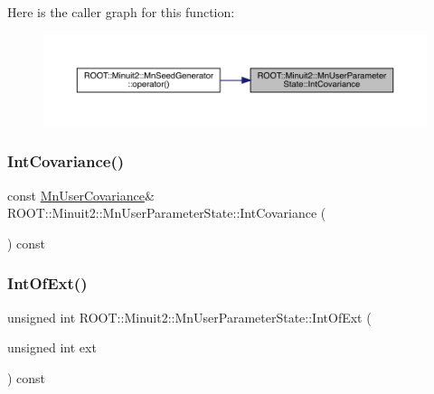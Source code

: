Here is the caller graph for this function\+:\nopagebreak
\begin{figure}[H]
\begin{center}
\leavevmode
\includegraphics[width=350pt]{d3/de0/classROOT_1_1Minuit2_1_1MnUserParameterState_ad4b67f98845868977a7b7d99c8ffbe2d_icgraph}
\end{center}
\end{figure}
\mbox{\label{classROOT_1_1Minuit2_1_1MnUserParameterState_ad4b67f98845868977a7b7d99c8ffbe2d}} 
\subsubsection{\texorpdfstring{IntCovariance()}{IntCovariance()}\hspace{0.1cm}{\footnotesize\ttfamily [2/2]}}
{\footnotesize\ttfamily const \mbox{\hyperlink{classROOT_1_1Minuit2_1_1MnUserCovariance}{Mn\+User\+Covariance}}\& R\+O\+O\+T\+::\+Minuit2\+::\+Mn\+User\+Parameter\+State\+::\+Int\+Covariance (\begin{DoxyParamCaption}{ }\end{DoxyParamCaption}) const\hspace{0.3cm}{\ttfamily [inline]}}

\mbox{\label{classROOT_1_1Minuit2_1_1MnUserParameterState_ab07f3ff917c70471b327243764aaad83}} 
\subsubsection{\texorpdfstring{IntOfExt()}{IntOfExt()}\hspace{0.1cm}{\footnotesize\ttfamily [1/2]}}
{\footnotesize\ttfamily unsigned int R\+O\+O\+T\+::\+Minuit2\+::\+Mn\+User\+Parameter\+State\+::\+Int\+Of\+Ext (\begin{DoxyParamCaption}\item[{unsigned int}]{ext }\end{DoxyParamCaption}) const}


